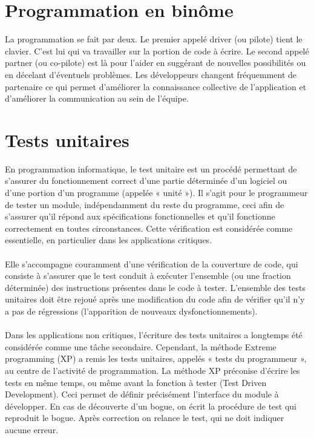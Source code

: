 \section{Programmation en binôme}\label{lexique:pairProgramming}
La programmation se fait par deux. Le premier appelé driver (ou pilote) tient le clavier. C'est lui qui va travailler sur la portion de code à écrire. Le second appelé partner (ou co-pilote) est là pour l'aider en suggérant de nouvelles possibilités ou en décelant d'éventuels problèmes. Les développeurs changent fréquemment de partenaire ce qui permet d'améliorer la connaissance collective de l'application et d'améliorer la communication au sein de l'équipe. 
\section{Tests unitaires}\label{lexique:testU}
En programmation informatique, le test unitaire est un procédé permettant de s'assurer du fonctionnement correct d'une partie déterminée d'un logiciel ou d'une portion d'un programme (appelée « unité »). Il s'agit pour le programmeur de tester un module, indépendamment du reste du programme, ceci afin de s'assurer qu'il répond aux spécifications fonctionnelles et qu'il fonctionne correctement en toutes circonstances. Cette vérification est considérée comme essentielle, en particulier dans les applications critiques.
\paragraph*{}
Elle s'accompagne couramment d'une vérification de la couverture de code, qui consiste à s'assurer que le test conduit à exécuter l'ensemble (ou une fraction déterminée) des instructions présentes dans le code à tester. L'ensemble des tests unitaires doit être rejoué après une modification du code afin de vérifier qu'il n'y a pas de régressions (l'apparition de nouveaux dysfonctionnements). 
\paragraph*{}
Dans les applications non critiques, l'écriture des tests unitaires a longtemps été considérée comme une tâche secondaire. Cependant, la méthode Extreme programming (XP) a remis les tests unitaires, appelés « tests du programmeur », au centre de l'activité de programmation. La méthode XP préconise d'écrire les tests en même temps, ou même avant la fonction à tester (Test Driven Development). Ceci permet de définir précisément l'interface du module à développer. En cas de découverte d'un bogue, on écrit la procédure de test qui reproduit le bogue. Après correction on relance le test, qui ne doit indiquer aucune erreur.
